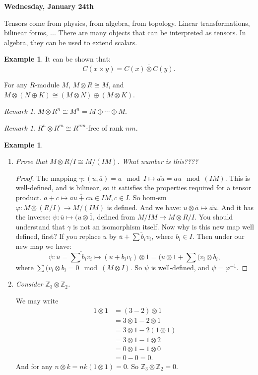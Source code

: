 \documentclass[9pt,reqno,twoside]{amsbook}
\theoremstyle{plain}
\numberwithin{section}{chapter}
\numberwithin{equation}{chapter}
\theoremstyle{definition}
\newtheorem{Ex}[theorem]{Example}
\theoremstyle{remark}
\newtheorem{rem}[theorem]{Remark}
\theoremstyle{plain}
\newcommand{\z}{\mathbb{Z}}
\newcommand{\bee}{\begin{equation}\begin{aligned}}
\newcommand{\eee}{\end{aligned}\end{equation}}
\newcommand{\tens}{\otimes}
\renewcommand{\bar}{\overline}%
\renewcommand{\phi}{\varphi}
\begin{document}
\textbf{Wednesday, January 24th}

Tensors come from physics, from algebra, from topology. Linear transformations, bilinear forms, ... There are many objects that can be interpreted as tensors. In algebra, they can be used to extend scalars. 

\begin{Ex}
It can be shown that:
$$
C(x \times y) = \bar{C(x) \tens C(y)}.
$$
\end{Ex}

For any $R$-module $M$, $M \tens R \cong M$, and $M \tens(N \oplus K) \cong (M \tens N) \oplus (M \tens K)$. 

\begin{rem}
$M \tens R^n \cong M^n = M \oplus \cdots \oplus M$. 
\end{rem}

\begin{rem}\label{1097}
$R^n \tens R^m \cong R^{nm}$-free of rank $nm$. 
\end{rem}

\begin{Ex}
\vspace{5mm}
\begin{enumerate}


\item \textit{Prove that $M \tens R/I \cong M/(IM)$. What number is this????}
\begin{proof}
The mapping $\gamma:(u,\bar{a}) = a \mod I \mapsto \bar{au} = au \mod (IM)$. This is well-defined, and is bilinear, so it satisfies the properties required for a tensor product. $a + c \mapsto \bar{au + cu} \in IM, c \in I$. So hom-sm $\phi:M \tens (R/I) \to M/(IM)$ is defined. And we have: $u \tens \bar{a} \mapsto \bar{au}$. And it has the inverse: $\psi:\bar{u} \mapsto (u \tens \bar{1}$, defined from $M/IM \to M \tens R/I$. You should understand that $\gamma$ is not an isomorphism itself. Now why is this new map well defined, first? If you replace $u$ by $\bar{u }+ \bar{\sum b_iv_i}$, where $b_i \in I$. Then under our new map we have:
$$
\psi:\bar{u} = \bar{\sum b_iv_i} \mapsto (u + b_iv_i) \tens \bar{1} = (u \tens \bar{1} + \sum(v_i \tens \bar{b_i},
$$
where $\sum(v_i \tens \bar{b_i} = 0 \mod (M \tens I)$. So $\psi$ is well-defined, and $\psi = \phi^{-1}$. 
\end{proof}

\item \textit{Consider $\z_3 \tens \z_2$. }

We may write 
\bee
1 \tens 1 &= (3 - 2) \tens 1 \\
&= 3 \tens 1 - 2 \tens 1\\
&= 3 \tens 1 - 2( 1 \tens 1)\\
&= 3 \tens 1 - 1 \tens 2\\
&= 0 \tens 1 - 1 \tens 0\\
&= 0 - 0 = 0.
\eee
And for any $n \tens k = nk(1 \tens 1) =0$. So $\z_3 \tens \z_2 = 0$. 
\end{enumerate}
\end{Ex}
\end{document}
